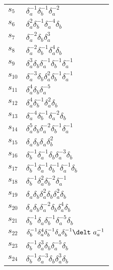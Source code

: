 \documentclass{article}
\begin{document}
\begin{center}
\begin{tabular}{ll}
$s_{5}$ & $\delta_a^{-1}\delta_b^{-1}\delta_a^{-2}$ \\
$s_{6}$ & $\delta_a^{2}\delta_b^{-1}\delta_a^{-4}\delta_b^{}$ \\
$s_{7}$ & $\delta_a^{-2}\delta_b^{}\delta_a^{3}$ \\
$s_{8}$ & $\delta_a^{-2}\delta_b^{-1}\delta_a^{4}\delta_b^{}$ \\
$s_{9}$ & $\delta_a^{3}\delta_b^{}\delta_a^{-1}\delta_b^{-1}\delta_a^{-1}$ \\
$s_{10}$ & $\delta_a^{-3}\delta_b^{}\delta_a^{2}\delta_b^{-1}\delta_a^{-1}$ \\
$s_{11}$ & $\delta_a^{4}\delta_b^{}\delta_a^{-5}$ \\
$s_{12}$ & $\delta_a^{4}\delta_b^{-1}\delta_a^{2}\delta_b^{}$ \\
$s_{13}$ & $\delta_a^{-4}\delta_b^{-1}\delta_a^{-2}\delta_b^{}$ \\
$s_{14}$ & $\delta_a^{5}\delta_b^{}\delta_a^{-2}\delta_b^{-1}\delta_a^{-1}$ \\
$s_{15}$ & $\delta_a^{}\delta_b^{}\delta_a^{}\delta_b^{2}$ \\
$s_{16}$ & $\delta_b^{-1}\delta_a^{-1}\delta_b^{}\delta_a^{-3}\delta_b^{}$ \\
$s_{17}$ & $\delta_b^{-1}\delta_a^{-1}\delta_b^{-1}\delta_a^{-1}\delta_b^{}$ \\
$s_{18}$ & $\delta_b^{-1}\delta_a^{2}\delta_b^{-2}\delta_a^{-1}$ \\
$s_{19}$ & $\delta_a^{}\delta_b^{}\delta_a^{2}\delta_b^{}\delta_a^{2}\delta_b^{\
}$ \\
$s_{20}$ & $\delta_a^{}\delta_b^{}\delta_a^{-2}\delta_b^{}\delta_a^{4}\delta_b^\
{}$ \\
$s_{21}$ & $\delta_b^{-1}\delta_a^{}\delta_b^{-1}\delta_a^{-5}\delta_b^{}$ \\
$s_{22}$ & $\delta_b^{-1}\delta_a^{4}\delta_b^{-1}\delta_a^{}\delta_b^{-1}\delt\
a_a^{-1}$ \\
$s_{23}$ & $\delta_b^{-1}\delta_a^{3}\delta_b^{}\delta_a^{-5}\delta_b^{}$ \\
$s_{24}$ & $\delta_b^{-1}\delta_a^{-3}\delta_b^{}\delta_a^{3}\delta_b^{}$ \\
\bottomrule
\end{tabular}
\end{center}

\thispagestyle{empty}
\end{document}
